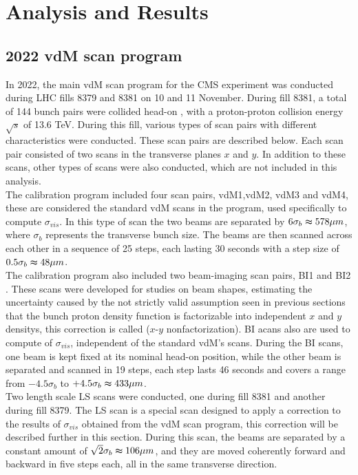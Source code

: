 \chapter{Analysis and Results}


\section{2022 vdM scan program}

In 2022, the main vdM scan program for the CMS experiment was conducted during LHC fills 8379 and 8381 on 10 and 11 November. During fill 8381, a total of 144 bunch pairs were collided head-on , with a proton-proton collision energy $\sqrt{s}$ of 13.6 TeV. 
During this fill, various types of scan pairs with different characteristics were conducted. These scan pairs are described below. Each scan pair consisted of two scans in the transverse planes $x$ and $y$. In addition to these scans, other types of scans were also conducted, which are not included in this analysis.\\ 

The calibration program included four scan pairs, vdM1,vdM2, vdM3 and vdM4, these are considered the standard vdM scans in the program, used specifically to compute $\sigma_{vis}$. In this type of scan the two beams are separated by $6\sigma_{b} \thickapprox 578\mu m$, where $\sigma_{b}$ represents the transverse bunch size. The beams are then scanned across each other in a sequence of 25 steps, each lasting 30 seconds with a step size of $0.5\sigma_{b} \thickapprox 48 \mu m$.\\

The calibration program also included two beam-imaging scan pairs, BI1 and BI2 . These scans were developed for studies on beam shapes, estimating the uncertainty caused by the not strictly valid assumption seen in previous sections that the bunch proton density function is factorizable into independent $x$ and $y$ densitys, this correction is called  ($x$-$y$ nonfactorization). BI acans also are used to compute of $\sigma_{vis}$, independent of the standard vdM's scans. During the BI scans, one beam is kept fixed at its nominal head-on position, while the other beam is separated and scanned in 19 steps, each step lasts 46 seconds and covers a range from $-4.5\sigma_{b}$ to $+4.5\sigma_{b} \thickapprox 433 \mu m$.\\

Two length scale LS scans were conducted, one during fill 8381 and another during fill 8379. The LS scan is a special scan designed to apply a correction to the results of  $\sigma_{vis}$ obtained from the vdM scan program, this correction will be described further in this section. During this scan, the beams are separated by a constant amount of $\sqrt{2} \sigma_{b} \thickapprox 106 \mu m$, and they are moved coherently forward and backward in five steps each, all in the same transverse direction.\\

